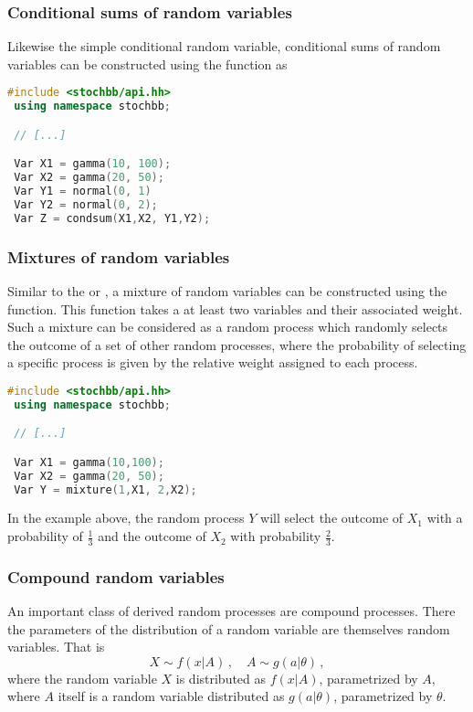 \subsubsection{Conditional sums of random variables}
Likewise the simple conditional random variable, conditional sums of random variables can be constructed 
using the  function as 
\begin{lstlisting}[language=C++]
 #include <stochbb/api.hh>
 using namespace stochbb;

 // [...]

 Var X1 = gamma(10, 100);
 Var X2 = gamma(20, 50);
 Var Y1 = normal(0, 1)
 Var Y2 = normal(0, 2);
 Var Z = condsum(X1,X2, Y1,Y2);
\end{lstlisting}

\subsubsection{Mixtures of random variables}
Similar to the  or , a mixture of random variables can be
constructed using the  function. This function takes a at least 
two variables and their associated weight. Such a mixture can be considered as a random process which
randomly selects the outcome of a set of other random processes, where the probability of
selecting a specific process is given by the relative weight assigned to each process.
\begin{lstlisting}[language=C++]
 #include <stochbb/api.hh>
 using namespace stochbb;

 // [...]

 Var X1 = gamma(10,100);
 Var X2 = gamma(20, 50);
 Var Y = mixture(1,X1, 2,X2);
\end{lstlisting}

In the example above, the random process $Y$ will select the outcome of $X_1$ with
a probability of $\frac{1}{3}$ and the outcome of $X_2$ with probability
$\frac{2}{3}$.

\subsubsection{Compound random variables}
An important class of derived random processes are compound processes. There the parameters of the
distribution of a random variable are themselves random variables. That is
\begin{equation}
 X \sim f(x|A)\,,\quad A \sim g(a|\theta)\,, \nonumber
\end{equation}
where the random variable $X$ is distributed as $f(x|A)$, parametrized by $A$,
where $A$ itself is a random variable distributed as $g(a|\theta)$, parametrized by
$\theta$. 


